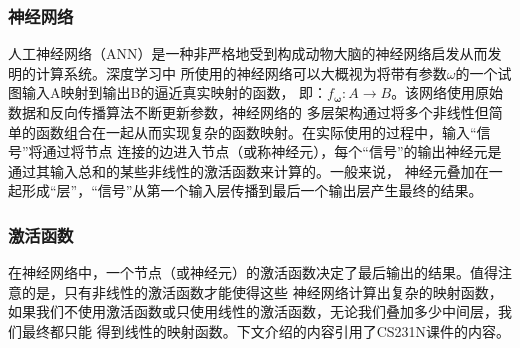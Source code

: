 \documentclass[supercite]{HustGraduPaper}
\theoremstyle{definition}
\begin{document}
\subsubsection{神经网络}

人工神经网络（ANN）是一种非严格地受到构成动物大脑的神经网络启发从而发明的计算系统\cite{wikipedia}。深度学习中
所使用的神经网络可以大概视为将带有参数$\omega$的一个试图输入A映射到输出B的逼近真实映射的函数，
即：$f_{\boldsymbol{\omega}}: A \rightarrow B$。该网络使用原始数据和反向传播算法不断更新参数，神经网络的
多层架构通过将多个非线性但简单的函数组合在一起从而实现复杂的函数映射。在实际使用的过程中，输入“信号”将通过将节点
连接的边进入节点（或称神经元），每个“信号”的输出神经元是通过其输入总和的某些非线性的激活函数来计算的。一般来说，
神经元叠加在一起形成“层”，“信号”从第一个输入层传播到最后一个输出层产生最终的结果。

\subsubsection{激活函数}

在神经网络中，一个节点（或神经元）的激活函数决定了最后输出的结果。值得注意的是，只有非线性的激活函数才能使得这些
神经网络计算出复杂的映射函数，如果我们不使用激活函数或只使用线性的激活函数，无论我们叠加多少中间层，我们最终都只能
得到线性的映射函数。下文介绍的内容引用了CS231N课件的内容\cite{cs231n}。
\end{document}
